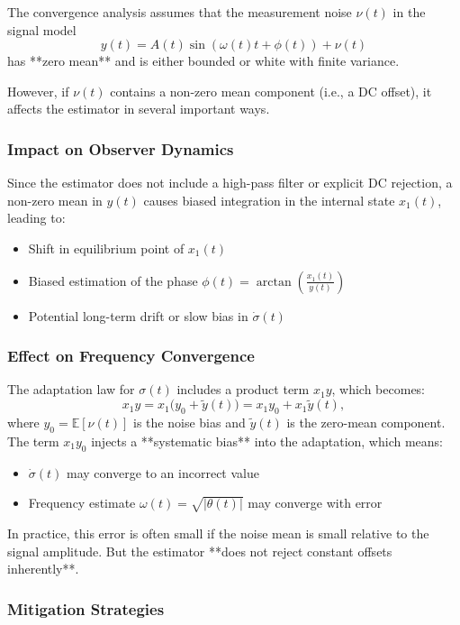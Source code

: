 \documentclass[12pt,letterpaper]{article}
\begin{document}
The convergence analysis assumes that the measurement noise \(\nu(t)\) in the signal model
\[
y(t) = A(t)\sin(\omega(t)t + \phi(t)) + \nu(t)
\]
has **zero mean** and is either bounded or white with finite variance.

However, if \(\nu(t)\) contains a non-zero mean component (i.e., a DC offset), it affects the estimator in several important ways.

\subsubsection*{Impact on Observer Dynamics}
Since the estimator does not include a high-pass filter or explicit DC rejection, a non-zero mean in \(y(t)\) causes biased integration in the internal state \(x_1(t)\), leading to:

\begin{itemize}
  \item Shift in equilibrium point of \(x_1(t)\)
  \item Biased estimation of the phase \(\phi(t) = \arctan\left(\frac{x_1(t)}{y(t)}\right)\)
  \item Potential long-term drift or slow bias in \(\dot{\sigma}(t)\)
\end{itemize}

\subsubsection*{Effect on Frequency Convergence}

The adaptation law for \(\sigma(t)\) includes a product term \(x_1 y\), which becomes:
\[
x_1 y = x_1 \bigl(y_0 + \tilde{y}(t)\bigr) = x_1 y_0 + x_1 \tilde{y}(t),
\]
where \(y_0 = \mathbb{E}[\nu(t)]\) is the noise bias and \(\tilde{y}(t)\) is the zero-mean component. The term \(x_1 y_0\) injects a **systematic bias** into the adaptation, which means:

\begin{itemize}
  \item \(\dot{\sigma}(t)\) may converge to an incorrect value
  \item Frequency estimate \(\omega(t) = \sqrt{|\theta(t)|}\) may converge with error
\end{itemize}

In practice, this error is often small if the noise mean is small relative to the signal amplitude. But the estimator **does not reject constant offsets inherently**.

\subsubsection*{Mitigation Strategies}
\end{document}
